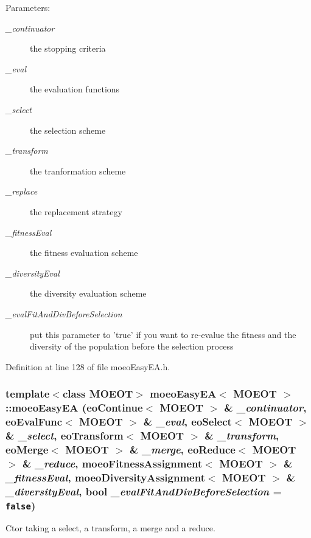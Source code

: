 \begin{Desc}
\item[Parameters:]
\begin{description}
\item[{\em \_\-continuator}]the stopping criteria \item[{\em \_\-eval}]the evaluation functions \item[{\em \_\-select}]the selection scheme \item[{\em \_\-transform}]the tranformation scheme \item[{\em \_\-replace}]the replacement strategy \item[{\em \_\-fitness\-Eval}]the fitness evaluation scheme \item[{\em \_\-diversity\-Eval}]the diversity evaluation scheme \item[{\em \_\-eval\-Fit\-And\-Div\-Before\-Selection}]put this parameter to 'true' if you want to re-evalue the fitness and the diversity of the population before the selection process \end{description}
\end{Desc}


Definition at line 128 of file moeo\-Easy\-EA.h.
\subsubsection{\setlength{\rightskip}{0pt plus 5cm}template$<$class MOEOT$>$ \bf{moeo\-Easy\-EA}$<$ MOEOT $>$::\bf{moeo\-Easy\-EA} (\bf{eo\-Continue}$<$ MOEOT $>$ \& {\em \_\-continuator}, \bf{eo\-Eval\-Func}$<$ MOEOT $>$ \& {\em \_\-eval}, \bf{eo\-Select}$<$ MOEOT $>$ \& {\em \_\-select}, \bf{eo\-Transform}$<$ MOEOT $>$ \& {\em \_\-transform}, \bf{eo\-Merge}$<$ MOEOT $>$ \& {\em \_\-merge}, \bf{eo\-Reduce}$<$ MOEOT $>$ \& {\em \_\-reduce}, \bf{moeo\-Fitness\-Assignment}$<$ MOEOT $>$ \& {\em \_\-fitness\-Eval}, \bf{moeo\-Diversity\-Assignment}$<$ MOEOT $>$ \& {\em \_\-diversity\-Eval}, bool {\em \_\-eval\-Fit\-And\-Div\-Before\-Selection} = {\tt false})\hspace{0.3cm}{\tt  [inline]}}\label{classmoeoEasyEA_564a3291a8239515328cf0a6b40f3c99}


Ctor taking a select, a transform, a merge and a reduce. 

